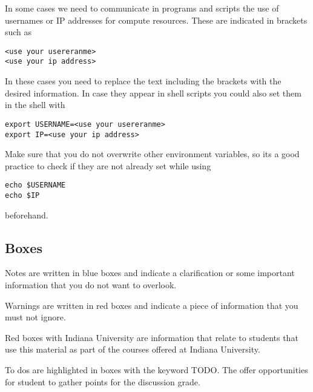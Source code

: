 

In some cases we need to communicate in programs and scripts the use of usernames 
or IP addresses for compute resources. These are indicated in brackets such as

\begin{lstlisting}
<use your usereranme>
<use your ip address>
\end{lstlisting}

In these cases you need to replace the text including the brackets 
with the desired information. In case they appear in shell scripts 
you could also set them in the shell with 

\begin{lstlisting}
export USERNAME=<use your usereranme>
export IP=<use your ip address>
\end{lstlisting}

Make sure that you do not overwrite other environment variables, 
so its a good practice to check if they are not already set while using 

\begin{lstlisting}
echo $USERNAME
echo $IP
\end{lstlisting}

beforehand.

\subsection{Boxes}

\begin{NOTE}
Notes are written in blue boxes and indicate a clarification or some
important information that you do not want to overlook.
\end{NOTE}

\begin{WARNING}
Warnings are written in red  boxes and indicate a piece of information
that you must not ignore.
\end{WARNING}

\begin{IU}
Red boxes with Indiana University are information that relate to
students that use this material as part of the courses offered at
Indiana University.
\end{IU}

To dos are highlighted in boxes with the keyword TODO. The offer
opportunities for student to gather points for the discussion grade.

